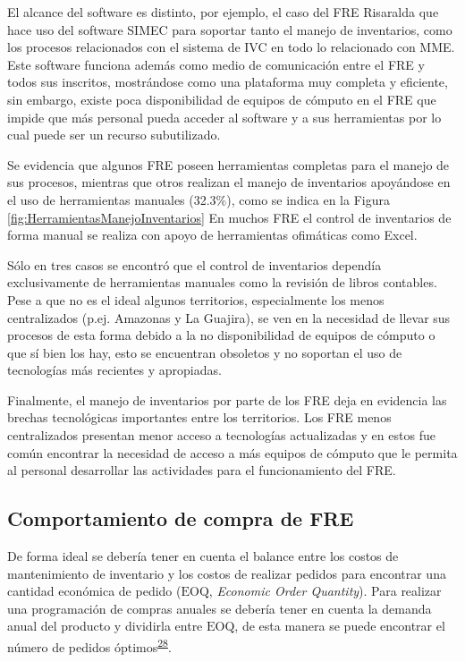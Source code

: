\documentclass[
]{book}
\begin{document}
El alcance del software es distinto, por ejemplo, el caso del FRE Risaralda que hace uso del software SIMEC para soportar tanto el manejo de inventarios, como los procesos relacionados con el sistema de IVC en todo lo relacionado con MME. Este software funciona además como medio de comunicación entre el FRE y todos sus inscritos, mostrándose como una plataforma muy completa y eficiente, sin embargo, existe poca disponibilidad de equipos de cómputo en el FRE que impide que más personal pueda acceder al software y a sus herramientas por lo cual puede ser un recurso subutilizado.

Se evidencia que algunos FRE poseen herramientas completas para el manejo de sus procesos, mientras que otros realizan el manejo de inventarios apoyándose en el uso de herramientas manuales (32.3\%), como se indica en la Figura \ref{fig:HerramientasManejoInventarios} En muchos FRE el control de inventarios de forma manual se realiza con apoyo de herramientas ofimáticas como Excel.

Sólo en tres casos se encontró que el control de inventarios dependía exclusivamente de herramientas manuales como la revisión de libros contables. Pese a que no es el ideal algunos territorios, especialmente los menos centralizados (p.ej. Amazonas y La Guajira), se ven en la necesidad de llevar sus procesos de esta forma debido a la no disponibilidad de equipos de cómputo o que sí bien los hay, esto se encuentran obsoletos y no soportan el uso de tecnologías más recientes y apropiadas.

Finalmente, el manejo de inventarios por parte de los FRE deja en evidencia las brechas tecnológicas importantes entre los territorios. Los FRE menos centralizados presentan menor acceso a tecnologías actualizadas y en estos fue común encontrar la necesidad de acceso a más equipos de cómputo que le permita al personal desarrollar las actividades para el funcionamiento del FRE.

\hypertarget{comportamiento-de-compra-de-fre}{%
\subsection{Comportamiento de compra de FRE}\label{comportamiento-de-compra-de-fre}}

De forma ideal se debería tener en cuenta el balance entre los costos de mantenimiento de inventario y los costos de realizar pedidos para encontrar una cantidad económica de pedido (\(\mathrm{EOQ}\), \emph{Economic Order Quantity}). Para realizar una programación de compras anuales se debería tener en cuenta la demanda anual del producto y dividirla entre \(\mathrm{EOQ}\), de esta manera se puede encontrar el número de pedidos óptimos\textsuperscript{\protect\hyperlink{ref-Silver2017}{28}}.
\end{document}

